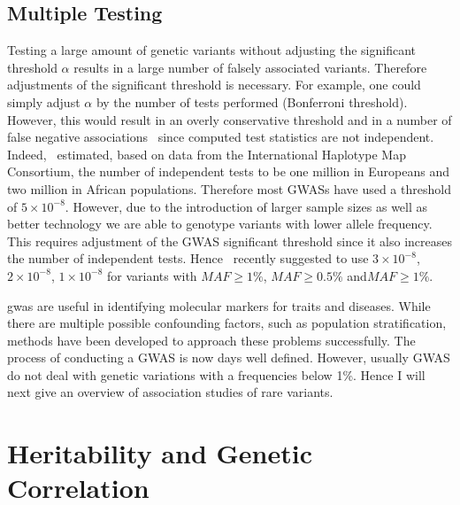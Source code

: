 \subsection{Multiple Testing}
\label{ssec:multiple_testing}
Testing a large amount of genetic variants without adjusting the significant threshold $\alpha$ results in a large number of falsely associated variants.
Therefore adjustments of the significant threshold is necessary.
For example, one could simply adjust $\alpha$ by the number of tests performed (Bonferroni threshold).
However, this would result in an overly conservative threshold and in a number of false negative associations~\cite{Benjamini1995} since computed test statistics are not independent.
Indeed,~\citet{Peer2008} estimated, based on data from the International Haplotype Map Consortium, the number of independent tests to be one million in Europeans and two million in African populations.
Therefore most GWASs have used a threshold of $5\times 10^{-8}$.
However, due to the introduction of larger sample sizes as well as better technology we are able to genotype variants with lower allele frequency.
This requires adjustment of the GWAS significant threshold since it also increases the number of independent tests.
Hence~\citet{Fadista2016} recently suggested to use $3\times10^{-8}$, $2\times10^{-8}$, $1\times10^{-8}$ for variants with $MAF\ge1\%$, $MAF\ge0.5\%$ and$ MAF\ge1\%$.

\acrshort{gwas} are useful in identifying molecular markers for traits and diseases.
While there are multiple possible confounding factors, such as population stratification, methods have been developed to approach these problems successfully.
The process of conducting a GWAS is now days well defined.
However, usually GWAS do not deal with genetic variations with a frequencies below 1\%.
Hence I will next give an overview of association studies of rare variants.

\section{Heritability and Genetic Correlation}
\label{sec:heritability_and_genetic_correlation}

